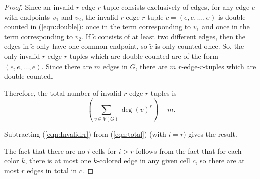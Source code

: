 \documentclass[10pt,a4paper]{amsart}
\begin{document}
\begin{proof}
Since an invalid $r$-edge-$r$-tuple consists exclusively of edges, for any edge $e$ with endpoints $v_1$ and $v_2$, the invalid $r$-edge-$r$-tuple $\tilde c = (e,e,\dots,e)$ is double-counted in (\ref{eqn:double}): once in the term corresponding to $v_1$ and once in the term corresponding to $v_2.$  If $\tilde c$ consists of at least two different edges, then the edges in $\tilde c$ only have one common endpoint, so $\tilde c$ is only counted once. So, the only invalid $r$-edge-$r$-tuples which are double-counted are of the form $(e,e,\dots,e).$ Since there are $m$ edges in $G$, there are $m$ $r$-edge-$r$-tuples which are double-counted.

Therefore, the total number of invalid $r$-edge-$r$-tuples is 
\begin{equation}\label{eqn:Invalidrr}
    \left(\sum_{v\in V(G)}\deg(v)^r\right)-m.
\end{equation}

Subtracting (\ref{eqn:Invalidrr}) from (\ref{eqn:total}) (with $i=r$) gives the result.

The fact that there are no $i$-cells for $i>r$ follows from the fact that for each color $k$, there is at most one $k$-colored edge in any given cell $c$, so there are at most $r$ edges in total in $c$.
\end{proof}
\end{document}
